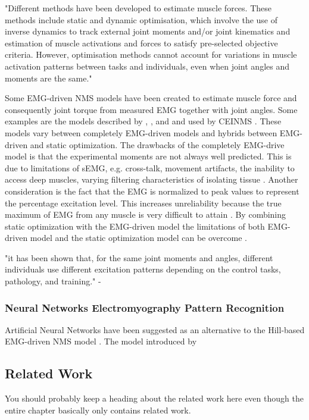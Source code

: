 "Different methods have been developed to estimate muscle forces. These methods include static and dynamic optimisation, which involve the use of inverse dynamics to track external joint moments and/or joint kinematics and estimation of muscle activations and forces to satisfy pre-selected objective criteria. However, optimisation methods cannot account for variations in muscle activation patterns  between tasks and individuals, even when joint angles and moments are the same." \cite{Pizzolato2015}

Some EMG-driven NMS models have been created to estimate muscle force and consequently joint torque from measured EMG together with joint angles. 
Some examples are the models described by  \citeauthor{Lloyd2003} \cite{Lloyd2003}, \citeauthor{Sartori2014} \cite{Sartori2014}, and \citeauthor{Sartori2012a} \cite{Sartori2012a} and used by CEINMS \cite{Pizzolato2015}. 
These models vary between completely EMG-driven models and hybrids between EMG-driven and static optimization.
The drawbacks of the completely EMG-drive model is that the experimental moments are not always well predicted.
This is due to limitations of sEMG, e.g. cross-talk, movement artifacts, the inability to access deep muscles, varying filtering characteristics of isolating tissue \cite{Lloyd2003, Sartori2014}.
Another consideration is the fact that the EMG is normalized to peak values to represent the percentage excitation level. 
This increases unreliability because the true maximum of EMG from any muscle is very difficult to attain \cite{Sartori2014}.
By combining static optimization with the EMG-driven model the limitations of both EMG-driven model and the static optimization model can be overcome \cite{Sartori2014}.

"it has been shown that, for the same joint moments and angles, different
individuals use different excitation patterns depending on the control
tasks, pathology, and training." - \cite[p. 3614]{Sartori2014}

\subsubsection{Neural Networks Electromyography Pattern Recognition}

Artificial Neural Networks have been suggested as an alternative to the Hill-based EMG-driven NMS model \cite{Rosen1999, Sepulveda1993}.
The model introduced by \citeauthor{Sepulveda1993} \cite{Sepulveda1993}

\subsection{Related Work}
You should probably keep a heading about the related work here even though the entire chapter basically only contains related work.
